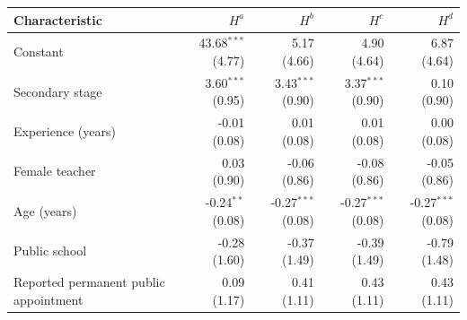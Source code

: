 \begin{tabular}{p{5.6cm}rrrr}
\toprule
Characteristic & $H^a$ & $H^b$ & $H^c$ & $H^d$ \\
\midrule
Constant & \shortstack{43.68$^{***}$\\{\scriptsize (4.77)}} & \shortstack{5.17\\{\scriptsize (4.66)}} & \shortstack{4.90\\{\scriptsize (4.64)}} & \shortstack{6.87\\{\scriptsize (4.64)}} \\
Secondary stage & \shortstack{3.60$^{***}$\\{\scriptsize (0.95)}} & \shortstack{3.43$^{***}$\\{\scriptsize (0.90)}} & \shortstack{3.37$^{***}$\\{\scriptsize (0.90)}} & \shortstack{0.10\\{\scriptsize (0.90)}} \\
Experience (years) & \shortstack{-0.01\\{\scriptsize (0.08)}} & \shortstack{0.01\\{\scriptsize (0.08)}} & \shortstack{0.01\\{\scriptsize (0.08)}} & \shortstack{0.00\\{\scriptsize (0.08)}} \\
Female teacher & \shortstack{0.03\\{\scriptsize (0.90)}} & \shortstack{-0.06\\{\scriptsize (0.86)}} & \shortstack{-0.08\\{\scriptsize (0.86)}} & \shortstack{-0.05\\{\scriptsize (0.86)}} \\
Age (years) & \shortstack{-0.24$^{**}$\\{\scriptsize (0.08)}} & \shortstack{-0.27$^{***}$\\{\scriptsize (0.08)}} & \shortstack{-0.27$^{***}$\\{\scriptsize (0.08)}} & \shortstack{-0.27$^{***}$\\{\scriptsize (0.08)}} \\
Public school & \shortstack{-0.28\\{\scriptsize (1.60)}} & \shortstack{-0.37\\{\scriptsize (1.49)}} & \shortstack{-0.39\\{\scriptsize (1.49)}} & \shortstack{-0.79\\{\scriptsize (1.48)}} \\
Reported permanent public appointment & \shortstack{0.09\\{\scriptsize (1.17)}} & \shortstack{0.41\\{\scriptsize (1.11)}} & \shortstack{0.43\\{\scriptsize (1.11)}} & \shortstack{0.43\\{\scriptsize (1.11)}} \\

\end{tabular}
